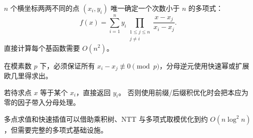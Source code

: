 $n$ 个横坐标两两不同的点 $(x_i,y_i)$ 唯一确定一个次数小于 $n$ 的多项式：
\[
  f(x)=\sum_{i=1}^{n}y_i
  \prod_{\substack{1\le j\le n\\j\ne i}}
  \frac{x-x_j}{x_i-x_j}.
\]
直接计算每个基函数需要 $O(n^2)$。

在模素数 $p$ 下，必须保证所有 $x_i-x_j\not\equiv0\pmod p$，分母逆元使用快速幂或扩展欧几里得求出。

\begin{icpcwarning}[提前命中]
  若待求点 $x$ 等于某个 $x_i$，直接返回 $y_i$。
  否则使用前缀/后缀积优化时会把本应为零的因子带入分母处理。
\end{icpcwarning}

多点求值和快速插值可以借助乘积树、NTT 与多项式取模优化到约 $O(n\log^2n)$，但需要完整的多项式基础设施。

